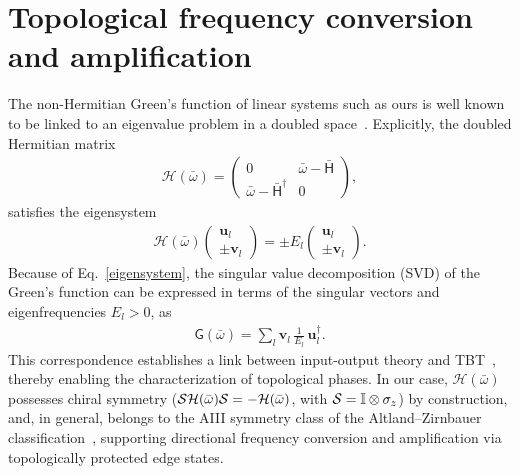 \documentclass[a4paper,twocolumn,floatfix,10pt,superscriptaddress]%
{quantumarticle}
\newcommand{\aprc}[1]{{\color{aprcolor}{[APR: #1]}}}
\newcommand{\msf}[1]{\mathsf{#1}}
\newcommand{\mcl}[1]{\mathcal{#1}}
\newcommand{\bsb}[1]{\boldsymbol{#1}}
\newcommand{\bomega}{{\bar{\omega}}}
\newcommand{\mcH}{{\mcl{H}}}
\newcommand{\msH}{{\msf{H}}}
\newcommand{\bu}{{\bsb{u}}}
\newcommand{\bv}{{\bsb{v}}}
\begin{document}
\section{Topological frequency conversion and amplification}
The non-Hermitian Green's function of linear systems such as ours is well known to be linked to an eigenvalue problem in a doubled space~\cite{Porras2019,Ramos2021,ClaveroRubio2025,Gomez2022,GomezLeon2023,Herviou2019}. Explicitly,  the doubled Hermitian matrix
\begin{align}\label{eq:doubled_matrix}
\mcH(\bomega) =
\begin{pmatrix}
0 & \bomega - \bar{\msH} \\
\bomega - \bar{\msH}^\dag & 0
\end{pmatrix},
\end{align} satisfies the eigensystem 
\begin{align}\label{eigensystem}
\mcH(\bomega)\begin{pmatrix}
        \bu_l\\ \pm \bv_l
    \end{pmatrix}=\pm E_l \begin{pmatrix}
        \bu_l\\ \pm \bv_l
    \end{pmatrix}.
\end{align}
\aprc{There should be $\tilde{\msH}\rightarrow\bar{\msH}$}
Because of Eq.~\eqref{eigensystem}, the singular value decomposition (SVD) of the Green’s function can be expressed in terms of the singular vectors and eigenfrequencies $E_l>0$, as
\begin{eqnarray}
    \msf{G}(\bomega) = \sum_l \bv_l\, \frac{1}{E_l}\, \bu_l^\dag.
\end{eqnarray}
 This correspondence establishes a link between input-output theory and TBT~\cite{Ramos2021}, thereby enabling the characterization of topological phases. In our case, $\mcH(\bar{\omega})$ possesses chiral symmetry (${\cal S}\mcH(\bar{\omega}){\cal S} = -\mcH(\bar{\omega})$, with ${\cal S} = \mathbb{I}\otimes\sigma_z$) by construction, and, in general, belongs to the AIII symmetry class of the Altland–Zirnbauer classification~\cite{Altland1997,Roy2017_FTI-classification}, supporting directional frequency conversion and amplification via topologically protected edge states.
\end{document}
